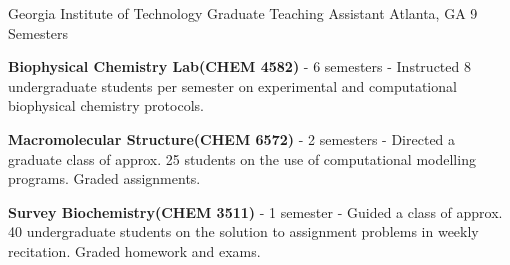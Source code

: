 \begin{cventries}
  \cventry
    {Georgia Institute of Technology} %
    {Graduate Teaching Assistant} %
    {Atlanta, GA} %
    {9 Semesters} %
    {
      \begin{cvitems} %
        \item {\textbf{Biophysical Chemistry Lab{\scriptsize (CHEM 4582)}} - 6 semesters - Instructed 8 undergraduate students per semester on experimental and computational biophysical chemistry protocols.}
        \item {\textbf{Macromolecular Structure{\scriptsize (CHEM 6572)}} - 2 semesters - Directed a graduate class of approx. 25 students on the use of computational modelling programs. Graded assignments.}
        \item {\textbf{Survey Biochemistry{\scriptsize (CHEM 3511)}} - 1 semester - Guided a class of approx. 40 undergraduate students on the solution to assignment problems in weekly recitation. Graded homework and exams.}
      \end{cvitems}
    }


\vspace{-4.0mm}
\end{cventries}
